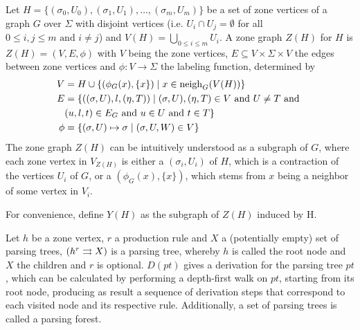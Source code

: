 \documentclass[]{report}
\begin{document}
\begin{definition}
	\label{def:z}
	Let $H = \{(\sigma_0,U_0),(\sigma_1,U_1),\dots,(\sigma_m,U_m)\}$ be a set of zone vertices of a graph $G$ over $\Sigma$ with disjoint vertices (i.e. $U_i \cap U_j = \emptyset$ for all $0 \leq i,j \leq m \text{ and } i \neq j$) and $V(H) = \bigcup_{0 \leq i \leq m}{U_i}$. A zone graph $Z(H)$ for $H$ is $Z(H) = (V, E, \phi)$ with $V$ being the zone vertices, $E \subseteq V \times \Sigma \times V$ the edges between zone vertices and $\phi: V \to \Sigma$ the labeling function, determined by
	\begin{align*}
		V & = H \cup \{(\phi_G(x),\{x\}) \; | \; x \in \operatorname{neigh}_{G}(V(H)) \}\\
		E & = \{((\sigma,U),l,(\eta,T)) \; | \; (\sigma,U),(\eta,T) \in V \text{ and } U \neq T \text{ and } \\
		& (u,l,t) \in E_G \text{ and } u \in U \text{ and } t \in T\} \\
		\phi & = \{(\sigma,U) \mapsto \sigma  \; | \; (\sigma,U,W) \in V\}
	\end{align*}
	The zone graph $Z(H)$ can be intuitively understood as a subgraph of $G$, where each zone vertex in $V_{Z(H)}$ is either a $(\sigma_i,U_i)$ of $H$, which is a contraction of the vertices $U_i$ of $G$, or a $(\phi_G(x),\{x\})$, which stems from $x$ being a neighbor of some vertex in $V_i$.
	
	For convenience, define $Y(H)$ as the subgraph of $Z(H)$ induced by H.
\end{definition}

\begin{definition}
	Let $h$ be a zone vertex, $r$ a production rule and $X$ a (potentially empty) set of parsing trees, $\ptree{h}{r}{X}$ is a parsing tree, whereby $h$ is called the root node and $X$ the children and $r$ is optional. $D(pt)$ gives a derivation for the parsing tree $pt$, which can be calculated by performing a depth-first walk on $pt$, starting from its root node, producing as result a sequence of derivation steps that correspond to each visited node and its respective rule. Additionally, a set of parsing trees is called a parsing forest.
\end{definition}
\end{document}
